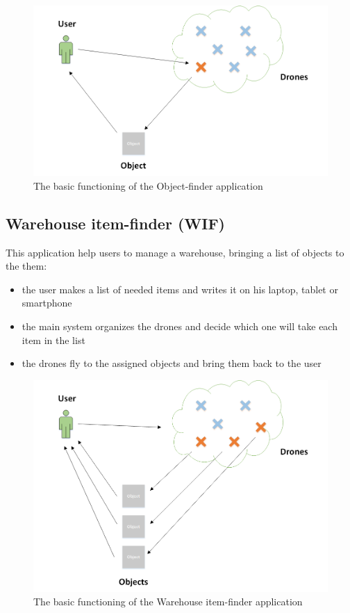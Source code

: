 \begin{figure}[H]
  \centering
  \includegraphics[width=\linewidth]{pictures/OF.png}
  \caption{The basic functioning of the Object-finder application}
  \label{fig:OF}
\end{figure}



\newpage

\subsection{Warehouse item-finder (WIF)}

This application help users to manage a warehouse, bringing a list of objects to the them:

\begin{itemize}
\itemsep2pt
\item{
the user makes a list of needed items and writes it on his laptop, tablet or smartphone}
\item{
the main system organizes the drones and decide which one will take each item in the list
}
\item{
the drones fly to the assigned objects and bring them back to the user
}

\end{itemize}


\begin{figure}[H]
  \centering
  \includegraphics[width=\linewidth]{pictures/WIF.png}
  \caption{The basic functioning of the Warehouse item-finder application}
  \label{fig:WIS}
\end{figure}


